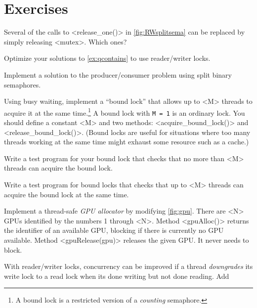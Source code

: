 \documentclass{report}
\begin{document}
\section*{Exercises}
\begin{problems}
\item Several of the calls to <{release_one()}> in
\autoref{fig:RWsplitsema} can be replaced by simply releasing <{mutex}>.
Which ones?
\item Optimize your solutions to \autoref{ex:qcontains} to use reader/writer locks.
\item \label{ex:bbsbs} Implement a solution to the producer/consumer problem
using split binary semaphores.
\item \label{ex:boundlock} Using busy waiting, implement a ``bound lock'' that allows
up to <{M}> threads to acquire it at the same time.\footnote{A bound lock is a restricted version of a \emph{counting} semaphore.}
A bound lock
with \texttt{M = 1} is an ordinary lock.
You should define a constant <{M}> and two methods:
<{acquire_bound_lock()}> and <{release_bound_lock()}>.
(Bound locks are useful for situations where too many threads working
at the same time might exhaust some resource such as a cache.)
\item Write a test program for your bound lock
that checks that no more than <{M}> threads can acquire the
bound lock.
\item Write a test program for bound locks
that checks that up to <{M}> threads
can acquire the bound lock at the same time.
\item \label{ex:gpu} Implement a thread-safe \emph{GPU allocator} by modifying
\autoref{fig:gpu}.
There are <{N}> GPUs identified by the numbers
1 through <{N}>.  Method <{gpuAlloc()}> returns the identifier
of an available GPU, blocking if there is currently no GPU available.
Method <{gpuRelease(gpu)}> releases the given GPU.  It never needs
to block.
\item With reader/writer locks,
concurrency can be improved if a thread \emph{downgrades} its write lock
to a read lock when its done writing but not done reading.  Add

\end{problems}
\end{document}

